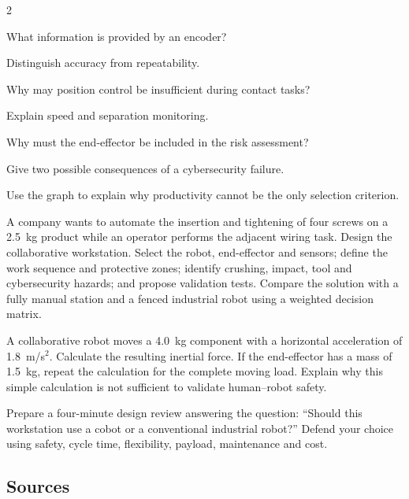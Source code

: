 \begin{multicols}{2}
\begin{questions}
\item What information is provided by an encoder?
\item Distinguish accuracy from repeatability.
\item Why may position control be insufficient during contact tasks?
\item Explain speed and separation monitoring.
\item Why must the end-effector be included in the risk assessment?
\item Give two possible consequences of a cybersecurity failure.
\item Use the graph to explain why productivity cannot be the only selection criterion.
\end{questions}

\begin{engineeringchallenge}
A company wants to automate the insertion and tightening of four screws on a 2.5~kg product while an operator performs the adjacent wiring task. Design the collaborative workstation. Select the robot, end-effector and sensors; define the work sequence and protective zones; identify crushing, impact, tool and cybersecurity hazards; and propose validation tests. Compare the solution with a fully manual station and a fenced industrial robot using a weighted decision matrix.
\end{engineeringchallenge}

\begin{applicationexercise}
A collaborative robot moves a 4.0~kg component with a horizontal acceleration of 1.8~m/s$^2$. Calculate the resulting inertial force. If the end-effector has a mass of 1.5~kg, repeat the calculation for the complete moving load. Explain why this simple calculation is not sufficient to validate human--robot safety.
\end{applicationexercise}

\begin{speaking}
Prepare a four-minute design review answering the question: ``Should this workstation use a cobot or a conventional industrial robot?'' Defend your choice using safety, cycle time, flexibility, payload, maintenance and cost.
\end{speaking}
\end{multicols}

\subsection*{Sources}
